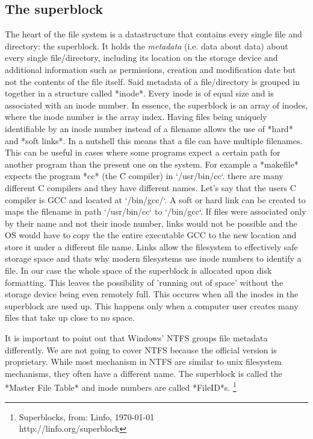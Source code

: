 \subsection{The superblock}

The heart of the file system is a datastructure that contains every single file and directory: the
superblock. It holds the \textit{metadata} (i.e. data about data) about every single file/directory,
including its location on the storage device and additional information such as permissions, creation
and modification date but not the contents of the file itself. Said metadata of a file/directory is
grouped in together in a structure called *inode*. Every inode is of equal size and is associated
with an inode number. In essence, the superblock is an array of inodes, where the inode number is the
array index. Having files being uniquely identifiable by an inode number instead of a filename allows 
the use of *hard* and *soft links*. In a nutshell this means that a file can have multiple filenames.
This can be useful in cases where some programs expect a certain path for another program than the
present one on the system. For example a *makefile* expects the program *cc* (the C compiler) in
`/usr/bin/cc`. there are many different C compilers and they have different names. Let's say that the
users C compiler is GCC and located at `/bin/gcc/`. A soft or hard link can be created to maps the
filename in path `/usr/bin/cc` to `/bin/gcc`. If files were associated only by their name and not 
their inode number, links would not be possible and the OS would have to copy the the entire
executable GCC to the new location and store it under a different file name. Links allow the
filesystem to effectively safe storage space and thats why modern filesystems use inode numbers to
identify a file. In our case the whole space of the superblock is allocated upon disk formatting.
This leaves the possibility of 'running out of space' without the storage device being even remotely
full. This occures when all the inodes in the superblock are used up. This happens only when a
computer user creates many files that take up close to no space.

It is important to point out that Windows' NTFS groups file metadata differently. We are not going to
cover NTFS because the official version is proprietary. While most mechanism in NTFS are similar to
unix filesystem mechanisms, they often have a different name. The superblock is called the *Master
File Table* and inode numbers are called *FileID*s. \footnote{Superblocks, from: Linfo, \today  \\ http://linfo.org/superblock}


